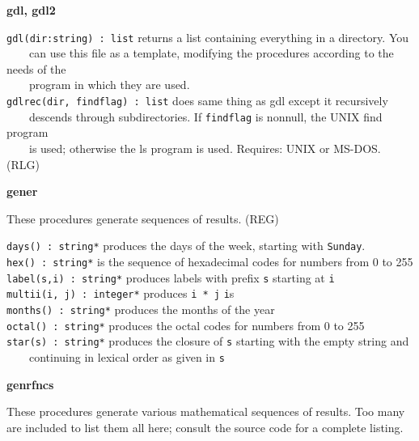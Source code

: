 {\sffamily\bfseries
gdl, gdl2}

\texttt{gdl(dir:string) : list} returns a list containing everything in
a directory. You\\
 \ \ \ \ can use this file as a template, modifying the procedures
according to the needs of the\\
 \ \ \ \ program in which they are used.\\
\texttt{gdlrec(dir, findflag) : list} does same thing as gdl except it
recursively\\
 \ \ \ \ descends through subdirectories. If \texttt{findflag} is
nonnull, the UNIX {\textquotedbl}find{\textquotedbl} program\\
 \ \ \ \ is used; otherwise the {\textquotedbl}ls{\textquotedbl} program
is used. Requires: UNIX or MS-DOS. (RLG)

{\sffamily\bfseries
gener}

These procedures generate sequences of results. (REG)

\texttt{days() : string*} produces the days of
the week, starting with
\texttt{{\textquotedbl}Sunday{\textquotedbl}}.\\
\texttt{hex() : string*} is the sequence of
hexadecimal codes for numbers from 0 to 255\\
\texttt{label(s,i) : string*} produces labels with prefix \texttt{s}
starting at \texttt{i}\\
\texttt{multii(i, j) : integer*} produces \texttt{i * j}
\texttt{i}{\textquotesingle}s\\
\texttt{months() : string*} produces the months of the year\\
\texttt{octal() : string*} produces the octal codes for
numbers from 0 to 255\\
\texttt{star(s) : string*} produces the closure of \texttt{s} starting with the
empty string and\\
 \ \ \ \ continuing in lexical order as given in \texttt{s} 

{\sffamily\bfseries
genrfncs}

These procedures generate various mathematical
sequences of results. Too many are included to list
them all here; consult the source code for a complete listing.

